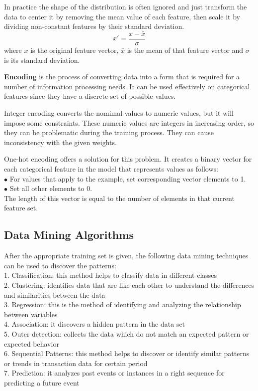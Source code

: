 In practice the shape of the distribution is often ignored and just transform the data to center it by removing the mean value of each feature, then scale it by dividing non-constant features by their standard deviation.
$$ x'= \frac{x-\bar x}{\sigma} $$
where $x$ is the original feature vector, $\bar x$ is the mean of that feature vector and $\sigma$ is its standard deviation.\bigskip

\textbf{Encoding} is the process of converting data into a form that is  required for a number of information processing needs. It can be used effectively on categorical features since they have a discrete set of possible values. \smallskip

Integer encoding converts the nomimal values to numeric values, but it will impose some constraints. These numeric values are integers in increasing order, so they can be problematic during the training process. They can cause inconsistency with the given weights.\smallskip

One-hot encoding offers a solution for this problem. It creates a binary vector for each categorical feature in the model that represents values as follows:\\
$\bullet$ For values that apply to the example, set corresponding vector elements to 1.\\
$\bullet$ Set all other elements to 0.\\
The length of this vector is equal to the number of elements in that current feature set.


\subsection{Data Mining Algorithms}

After the appropriate training set is given, the following data mining techniques can be used to discover the patterns:\\
1. Classification: this method helps to classify data in different classes\\
2. Clustering: identifies data that are like each other to understand the differences and similarities between the data\\
3. Regression: this is the method of identifying and analyzing the relationship between variables\\
4. Association: it discovers a hidden pattern in the data set\\
5. Outer detection: collects the data which do not match an expected pattern or expected behavior\\
6. Sequential Patterns: this method helps to discover or identify similar patterns or trends in transaction data for certain period\\
7. Prediction: it analyzes past events or instances in a right sequence for predicting a future event \medskip


